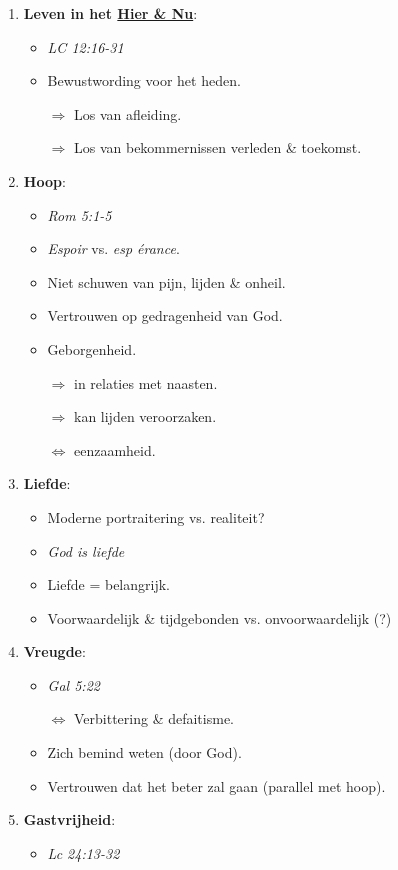 \begin{enumerate}
	\item \textbf{Leven in het \underline{Hier \& Nu}}:
	\begin{itemize}
		\item \textit{LC 12:16-31}
		\item Bewustwording voor het heden.
		\item[$\Rightarrow$] Los van afleiding.
		\item[$\Rightarrow$] Los van bekommernissen verleden \& toekomst.
	\end{itemize}
	\item \textbf{Hoop}:
	\begin{itemize}
		\item \textit{Rom 5:1-5}
		\item \textit{Espoir} vs. \textit{esp \'{e}rance}.
		\item Niet schuwen van pijn, lijden \& onheil.
		\item Vertrouwen op gedragenheid van God.
		\item Geborgenheid.
		\item[$\Rightarrow$] in relaties met naasten.
		\item[$\Rightarrow$] kan lijden veroorzaken.
		\item[$\Leftrightarrow$] eenzaamheid.
	\end{itemize}
	\item \textbf{Liefde}:
	\begin{itemize}
		\item Moderne portraitering vs. realiteit?
		\item \textit{God is liefde}
		\item Liefde = belangrijk.
		\item Voorwaardelijk \& tijdgebonden vs. onvoorwaardelijk (?)
	\end{itemize}
	\item \textbf{Vreugde}:
	\begin{itemize}
		\item \textit{Gal 5:22}
		\item[$\Leftrightarrow$] Verbittering \& defaitisme.
		\item  Zich bemind weten (door God).
		\item Vertrouwen dat het beter zal gaan (parallel met hoop).
	\end{itemize}
	\item \textbf{Gastvrijheid}:
	\begin{itemize}
		\item \textit{Lc 24:13-32}

\end{itemize}
\end{enumerate}
